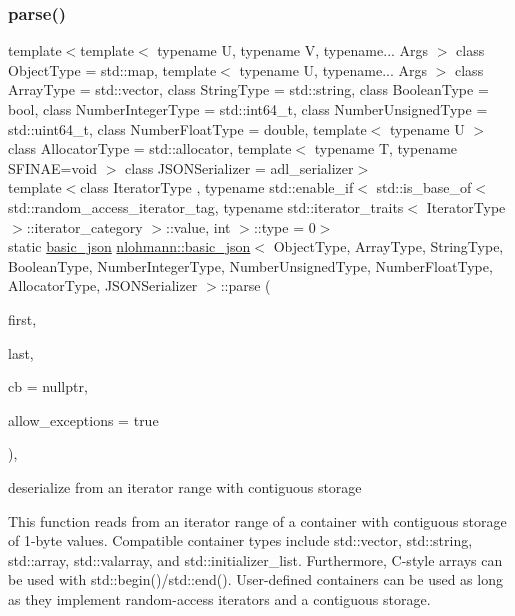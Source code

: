 \subsubsection{\texorpdfstring{parse()}{parse()}\hspace{0.1cm}{\footnotesize\ttfamily [2/2]}}
{\footnotesize\ttfamily template$<$template$<$ typename U, typename V, typename... Args $>$ class Object\+Type = std\+::map, template$<$ typename U, typename... Args $>$ class Array\+Type = std\+::vector, class String\+Type  = std\+::string, class Boolean\+Type  = bool, class Number\+Integer\+Type  = std\+::int64\+\_\+t, class Number\+Unsigned\+Type  = std\+::uint64\+\_\+t, class Number\+Float\+Type  = double, template$<$ typename U $>$ class Allocator\+Type = std\+::allocator, template$<$ typename T, typename S\+F\+I\+N\+A\+E=void $>$ class J\+S\+O\+N\+Serializer = adl\+\_\+serializer$>$ \\
template$<$class Iterator\+Type , typename std\+::enable\+\_\+if$<$ std\+::is\+\_\+base\+\_\+of$<$ std\+::random\+\_\+access\+\_\+iterator\+\_\+tag, typename std\+::iterator\+\_\+traits$<$ Iterator\+Type $>$\+::iterator\+\_\+category $>$\+::value, int $>$\+::type  = 0$>$ \\
static \mbox{\hyperlink{classnlohmann_1_1basic__json}{basic\+\_\+json}} \mbox{\hyperlink{classnlohmann_1_1basic__json}{nlohmann\+::basic\+\_\+json}}$<$ Object\+Type, Array\+Type, String\+Type, Boolean\+Type, Number\+Integer\+Type, Number\+Unsigned\+Type, Number\+Float\+Type, Allocator\+Type, J\+S\+O\+N\+Serializer $>$\+::parse (\begin{DoxyParamCaption}\item[{Iterator\+Type}]{first,  }\item[{Iterator\+Type}]{last,  }\item[{const \mbox{\hyperlink{classnlohmann_1_1basic__json_ab4f78c5f9fd25172eeec84482e03f5b7}{parser\+\_\+callback\+\_\+t}}}]{cb = {\ttfamily nullptr},  }\item[{const bool}]{allow\+\_\+exceptions = {\ttfamily true} }\end{DoxyParamCaption})\hspace{0.3cm}{\ttfamily [inline]}, {\ttfamily [static]}}



deserialize from an iterator range with contiguous storage 

This function reads from an iterator range of a container with contiguous storage of 1-\/byte values. Compatible container types include {\ttfamily std\+::vector}, {\ttfamily std\+::string}, {\ttfamily std\+::array}, {\ttfamily std\+::valarray}, and {\ttfamily std\+::initializer\+\_\+list}. Furthermore, C-\/style arrays can be used with {\ttfamily std\+::begin()}/{\ttfamily std\+::end()}. User-\/defined containers can be used as long as they implement random-\/access iterators and a contiguous storage.

